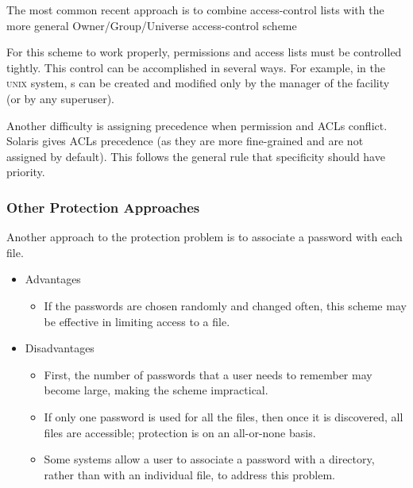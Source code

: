 The most common recent approach is to combine access-control lists with the more general Owner/Group/Universe access-control scheme

For this scheme to work properly, permissions and access lists must be controlled tightly.
This control can be accomplished in several ways.
For example, in the \textsc{unix} system, s can be created and modified only by the manager of the facility (or by any superuser).

Another difficulty is assigning precedence when permission and ACLs conflict.
Solaris gives ACLs precedence (as they are more fine-grained and are not assigned by default).
This follows the general rule that specificity should have priority.

\subsubsection{Other Protection Approaches}\label{subsubsec:Other_File_Protection_Approaches}
Another approach to the protection problem is to associate a password with each file.
\begin{itemize}[noitemsep]
\item Advantages
  \begin{itemize}[noitemsep]
  \item If the passwords are chosen randomly and changed often, this scheme may be effective in limiting access to a file.
  \end{itemize}
\item Disadvantages
  \begin{itemize}[noitemsep]
  \item First, the number of passwords that a user needs to remember may become large, making the scheme impractical.
  \item If only one password is used for all the files, then once it is discovered, all files are accessible; protection is on an all-or-none basis.
  \item Some systems allow a user to associate a password with a directory, rather than with an individual file, to address this problem.
  \end{itemize}
\end{itemize}


